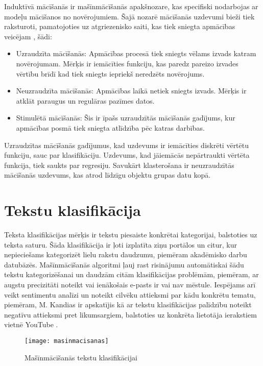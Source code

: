 Induktīvā mācīšanās ir mašīnmācīšanās apakšnozare, kas specifiski nodarbojas ar modeļu mācīšanos no novērojumiem. Šajā nozarē mācīšanās uzdevumi bieži tiek raksturoti, pamatojoties uz atgriezenisko saiti, kas tiek sniegta apmācības veicējam \cite{russel2010}, šādi:

\begin{itemize}
\item Uzraudzīta mācīšanās: Apmācības procesā tiek sniegts vēlams izvads katram novērojumam. Mērķis ir iemācīties funkciju, kas paredz pareizo izvades vērtību brīdī kad tiek sniegts iepriekš neredzēts novērojums.
\item Neuzraudzīta mācīšanās: Apmācības laikā netiek sniegts izvads. Mērķis ir atklāt paraugus un regulāras pazīmes datos.
\item Stimulētā mācīšanās: Šis ir īpašs uzraudzītās mācīšanās gadījums, kur apmācības posmā tiek sniegta atlīdzība pēc katras darbības.
\end{itemize}

Uzraudzītas mācīšanās gadījumus, kad uzdevums ir iemācīties diskrēti vērtētu funkciju, sauc par klasifikāciju. Uzdevums, kad jāiemācās nepārtraukti vērtēta funkcija, tiek saukts par regresiju. Savukārt klasterošana ir neuzraudzītās mācīšanās uzdevums, kas atrod līdzīgu objektu grupas datu kopā.

\section{Tekstu klasifikācija}

Teksta klasifikācijas mērķis ir tekstu piesaiste konkrētai kategorijai, balstoties uz teksta saturu. Šāda klasifikācija ir ļoti izplatīta ziņu portālos un citur, kur nepieciešams kategorizēt lielu rakstu daudzumu, piemēram akadēmisko darbu datubāzēs. Mašīnmācīšanās algoritmi ļauj rast risinājumu automātiskai šādu tekstu kategorizēšanai un daudzām citām klasifikācijas problēmām, piemēram, ar augstu precizitāti noteikt vai ienākošais e-pasts ir vai nav mēstule. Iespējams arī veikt sentimentu analīzi un noteikt cilvēku attieksmi par kādu konkrētu tematu, piemēram, M. Kandias ir apskatījis kā ar tekstu klasifikācijas palīdzību noteikt negatīvu attieksmi pret likumsargiem, balstoties uz konkrēta lietotāja ierakstiem vietnē YouTube \cite{threatdetectionyoutube}.

\begin{figure}[H]
	\texttt{[image: masinmacisanas]}
	\caption{Mašīnmācīšanās tekstu klasifikācijai}
	\label{fig:masinmacisanas}
\end{figure}

